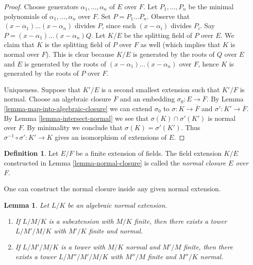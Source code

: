 \documentclass{stacks-project}
\theoremstyle{plain}
\newtheorem{lemma}[subsection]{Lemma}
\theoremstyle{definition}
\newtheorem{definition}[subsection]{Definition}
\theoremstyle{remark}
\numberwithin{equation}{subsection}
\begin{document}
\begin{proof}
Choose generators $\alpha_1, \ldots, \alpha_n$ of $E$ over $F$.
Let $P_1, \ldots, P_n$ be the minimal polynomials of
$\alpha_1, \ldots, \alpha_n$ over $F$. Set $P = P_1 \ldots P_n$.
Observe that $(x - \alpha_1) \ldots (x - \alpha_n)$ divides $P$, since
each $(x - \alpha_i)$ divides $P_i$. Say
$P = (x - \alpha_1) \ldots (x - \alpha_n)Q$.
Let $K/E$ be the splitting field of $P$ over $E$.
We claim that $K$ is the splitting field of $P$ over $F$ as well
(which implies that $K$ is normal over $F$).
This is clear because $K/E$ is generated by the roots of
$Q$ over $E$ and $E$ is generated by the roots of
$(x - \alpha_1) \ldots (x - \alpha_n)$ over $F$, hence
$K$ is generated by the roots of $P$ over $F$.

\medskip\noindent
Uniqueness. Suppose that $K'/E$ is a second smallest extension such that
$K'/F$ is normal. Choose an algebraic closure $\overline{F}$ and an
embedding $\sigma_0 : E \to \overline{F}$. By
Lemma \ref{lemma-map-into-algebraic-closure}
we can extend $\sigma_0$ to $\sigma : K \to \overline{F}$ and
$\sigma' : K' \to \overline{F}$.
By Lemma \ref{lemma-intersect-normal} we see that
$\sigma(K) \cap \sigma'(K')$ is normal over $F$.
By minimality we conclude that $\sigma(K) = \sigma'(K')$.
Thus $\sigma^{-1} \circ \sigma' : K' \to K$ gives an isomorphism
of extensions of $E$.
\end{proof}

\begin{definition}
\label{definition-normal-closure}
Let $E/F$ be a finite extension of fields. The field extension $K/E$
constructed in Lemma \ref{lemma-normal-closure}
is called the {\it normal closure $E$ over $F$}.
\end{definition}

\noindent
One can construct the normal closure inside any given normal extension.

\begin{lemma}
\label{lemma-normal-closure-inside-normal}
Let $L/K$ be an algebraic normal extension.
\begin{enumerate}
\item If $L/M/K$ is a subextension with $M/K$ finite, then there exists
a tower $L/M'/M/K$ with $M'/K$ finite and normal.
\item If $L/M'/M/K$ is a tower with $M/K$ normal and $M'/M$ finite,
then there exists a tower $L/M''/M'/M/K$ with $M''/M$
finite and $M''/K$ normal.
\end{enumerate}
\end{lemma}
\end{document}
